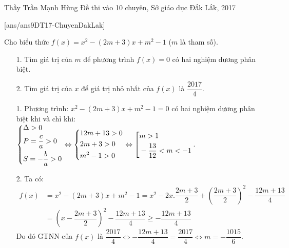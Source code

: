 \begin{name}
{Thầy  Trần Mạnh Hùng}
{Đề thi vào 10 chuyên, Sở giáo dục Đắk Lắk, 2017}
\end{name}
\setcounter{ex}{0}
[ans/ans9DT17-ChuyenDakLak]
\begin{ex}%
    Cho biểu thức $f(x)=x^2-\left(2m+3\right)x+m^2-1$ ($m$ là tham số).
    \begin{enumerate}
        \item[1.] Tìm giá trị của $m$ để phương trình $f(x)=0$ có hai nghiệm dương phân biệt.
        \item[2.] Tìm giá trị của $x$ để giá trị nhỏ nhất của $f(x)$ là $\dfrac{2017}{4}$.
    \end{enumerate}
\loigiai
    {
    \begin{enumerate}
        \item[1.] Phương trình: $x^2-\left(2m+3\right)x+m^2-1=0$ có hai nghiệm dương phân biệt khi và chỉ khi:\\
        $\left\{\begin{aligned}&\Delta >0\\& P=\dfrac{c}{a}>0\\& S=-\dfrac{b}{a}>0\end{aligned}\right.\Leftrightarrow \left\{\begin{aligned}&12m+13>0\\&2m+3>0\\&m^2-1>0\end{aligned}\right.\Leftrightarrow \left[\begin{aligned}&m>1\\& -\dfrac{13}{12}<m<-1\end{aligned}\right.$.
        \item[2.] Ta có: 
        \begin{align*}
        f(x)&=x^2-\left(2m+3\right)x+m^2-1=x^2-2x.\dfrac{2m+3}{2}+\left(\dfrac{2m+3}{2}\right)^2-\dfrac{12m+13}{4}\\&=\left(x-\dfrac{2m+3}{2}\right)^2-\dfrac{12m+13}{4}\ge -\dfrac{12m+13}{4}
        \end{align*}
        Do đó GTNN của $f(x)$ là $\dfrac{2017}{4}\Leftrightarrow -\dfrac{12m+13}{4}=\dfrac{2017}{4}\Leftrightarrow m=-\dfrac{1015}{6}$.   
    \end{enumerate}
    }
\end{ex}

